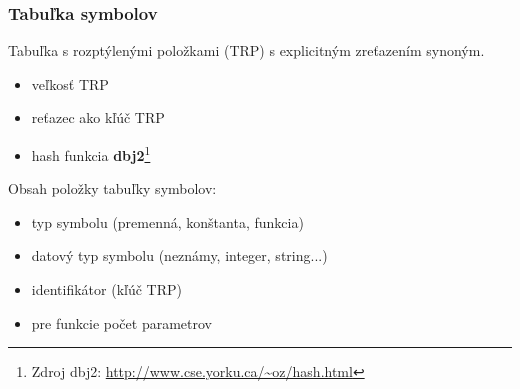 \documentclass[usenames,dvipsnames]{beamer}
\begin{document}
\begin{frame}
	\frametitle{Tabuľka symbolov}
	Tabuľka s rozptýlenými položkami (TRP) s explicitným zreťazením synoným.
	\begin{itemize}
		\item veľkosť TRP
		\item reťazec ako kľúč TRP
		\item hash funkcia \textbf{dbj2}\footnote{Zdroj dbj2: 
			\url{http://www.cse.yorku.ca/~oz/hash.html}}
	\end{itemize}
	Obsah položky tabuľky symbolov:
	\begin{itemize}
		\item typ symbolu (premenná, konštanta, funkcia)
		\item datový typ symbolu (neznámy, integer, string...)
		\item identifikátor (kľúč TRP)
		\item pre funkcie počet parametrov
	\end{itemize}
\end{frame}
\end{document}
